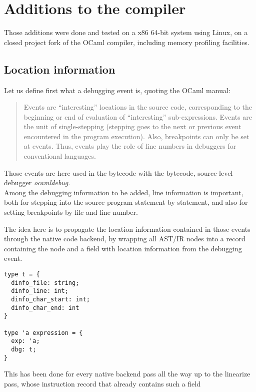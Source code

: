 \section{Additions to the compiler}

Those additions were done and tested on a x86 64-bit system using Linux, on a
closed project fork of the OCaml compiler, including memory profiling
facilities.

\subsection{Location information}

Let us define first what a debugging event is, quoting the OCaml manual:

\begin{quotation}
    Events are “interesting” locations in the source code, corresponding to the
    beginning or end of evaluation of “interesting” sub-expressions. Events are
    the unit of single-stepping (stepping goes to the next or previous event
    encountered in the program execution). Also, breakpoints can only be set at
    events. Thus, events play the role of line numbers in debuggers for
    conventional languages. \autocite{events}
\end{quotation}

Those events are here used in the bytecode with the bytecode, source-level
debugger \textit{ocamldebug}. \\

Among the debugging information to be added, line information is important,
both for stepping into the source program statement by statement,
and also for setting breakpoints by file and line number.

The idea here is to propagate the location information contained in those events
through the native code backend, by wrapping all AST/IR nodes into a record
containing the node and a field with location information from the debugging
event.

\begin{lstlisting}
type t = {
  dinfo_file: string;
  dinfo_line: int;
  dinfo_char_start: int;
  dinfo_char_end: int
}

type 'a expression = {
  exp: 'a;
  dbg: t;
}
\end{lstlisting}

This has been done for every native backend pass all the way up to the linearize
pass, whose instruction record that already contains such a field

